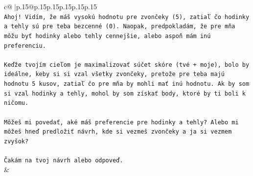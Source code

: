\documentclass{article}
\begin{document}
{\begin{supertabular}{c@{$\;$}|p{.15\linewidth}@{}p{.15\linewidth}p{.15\linewidth}p{.15\linewidth}p{.15\linewidth}p{.15\linewidth}}
{{{\\ 
\texttt{Ahoj! Vidím, že máš vysokú hodnotu pre zvončeky (5), zatiaľ čo hodinky a tehly sú pre teba bezcenné (0). Naopak, predpokladám, že pre mňa môžu byť hodinky alebo tehly cennejšie, alebo aspoň mám inú preferenciu.} \\
\\ 
\texttt{Keďže tvojím cieľom je maximalizovať súčet skóre (tvé + moje), bolo by ideálne, keby si si vzal všetky zvončeky, pretože pre teba majú hodnotu 5 kusov, zatiaľ čo pre mňa by mohli mať inú hodnotu. Ak by som si vzal hodinky a tehly, mohol by som získať body, ktoré by ti boli k ničomu.} \\
\\ 
\texttt{Môžeš mi povedať, aké máš preferencie pre hodinky a tehly? Alebo mi môžeš hneď predložiť návrh, kde si vezmeš zvončeky a ja si vezmem zvyšok?} \\
\\ 
\texttt{Čakám na tvoj návrh alebo odpoveď.} \\
            }
        }
    }
    & \\ \\


\end{supertabular}}
\end{document}
